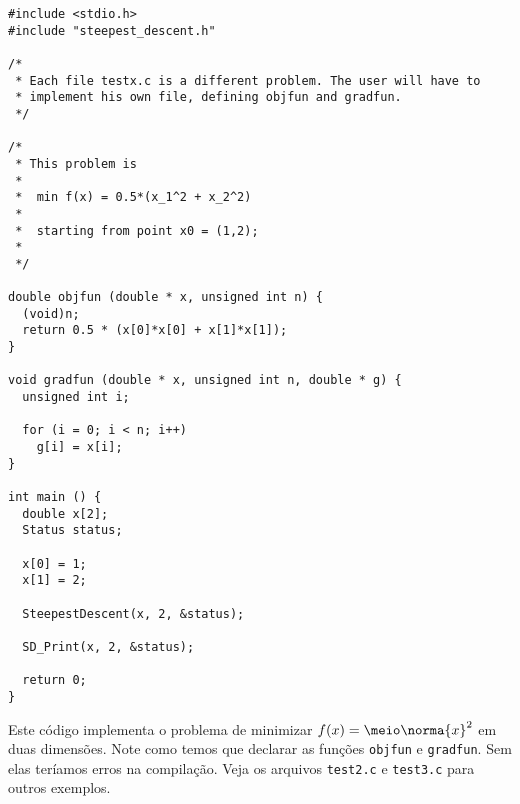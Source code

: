 \documentclass[letterpaper,11pt]{article}
\numberwithin{equation}{section}
\begin{document}
\begin{verbatim}
#include <stdio.h>
#include "steepest_descent.h"

/*
 * Each file testx.c is a different problem. The user will have to
 * implement his own file, defining objfun and gradfun.
 */

/*
 * This problem is
 *
 *  min f(x) = 0.5*(x_1^2 + x_2^2)
 *
 *  starting from point x0 = (1,2);
 *
 */

double objfun (double * x, unsigned int n) {
  (void)n;
  return 0.5 * (x[0]*x[0] + x[1]*x[1]);
}

void gradfun (double * x, unsigned int n, double * g) {
  unsigned int i;

  for (i = 0; i < n; i++)
    g[i] = x[i];
}

int main () {
  double x[2];
  Status status;

  x[0] = 1;
  x[1] = 2;

  SteepestDescent(x, 2, &status);

  SD_Print(x, 2, &status);

  return 0;
}
\end{verbatim}
\normalsize
Este código implementa o problema de minimizar $f(x) = \meio\norma{x}^2$ em duas dimensões.
Note como temos que declarar as funções \verb+objfun+ e \verb+gradfun+. Sem elas teríamos
erros na compilação. Veja os arquivos \verb+test2.c+ e \verb+test3.c+
para outros exemplos.
\end{document}
